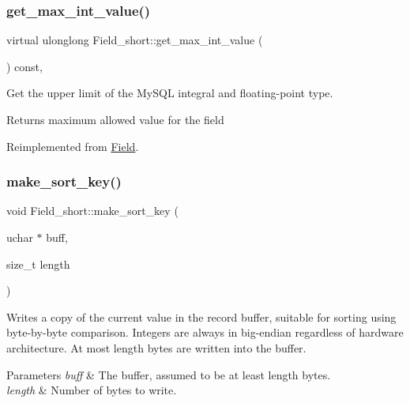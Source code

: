 \subsubsection{\texorpdfstring{get\+\_\+max\+\_\+int\+\_\+value()}{get\_max\_int\_value()}}
{\footnotesize\ttfamily virtual ulonglong Field\+\_\+short\+::get\+\_\+max\+\_\+int\+\_\+value (\begin{DoxyParamCaption}{ }\end{DoxyParamCaption}) const\hspace{0.3cm}{\ttfamily [inline]}, {\ttfamily [virtual]}}

Get the upper limit of the My\+S\+QL integral and floating-\/point type.

\begin{DoxyReturn}{Returns}
maximum allowed value for the field 
\end{DoxyReturn}


Reimplemented from \mbox{\hyperlink{classField_a22f18fbe3224a5ac4f23a90523b09087}{Field}}.

\mbox{\label{classField__short_a44284294029bf3384a67bead9878c167}} 
\subsubsection{\texorpdfstring{make\+\_\+sort\+\_\+key()}{make\_sort\_key()}}
{\footnotesize\ttfamily void Field\+\_\+short\+::make\+\_\+sort\+\_\+key (\begin{DoxyParamCaption}\item[{uchar $\ast$}]{buff,  }\item[{size\+\_\+t}]{length }\end{DoxyParamCaption})\hspace{0.3cm}{\ttfamily [virtual]}}

Writes a copy of the current value in the record buffer, suitable for sorting using byte-\/by-\/byte comparison. Integers are always in big-\/endian regardless of hardware architecture. At most length bytes are written into the buffer.


\begin{DoxyParams}{Parameters}
{\em buff} & The buffer, assumed to be at least length bytes.\\
\hline
{\em length} & Number of bytes to write. \\
\hline
\end{DoxyParams}


